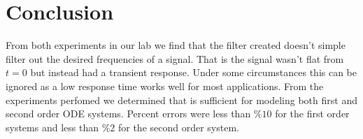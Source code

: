 \documentclass[main.tex]{subfile}
\begin{document}
\section{Conclusion} 
\label{sec:conclusion}

From both experiments in our lab we find that the filter created doesn't simple
filter out the desired frequencies of a signal. That is the signal wasn't flat
from $t = 0$ but instead had a transient response. Under some circumstances this
can be ignored as a low response time works well for most applications. From the
experiments perfomed we determined that \Labview is sufficient for modeling both
first and second order ODE systems. Percent errors were less than $\%10$ for the
first order systems and less than $\%2$ for the second order system.

\end{document}
